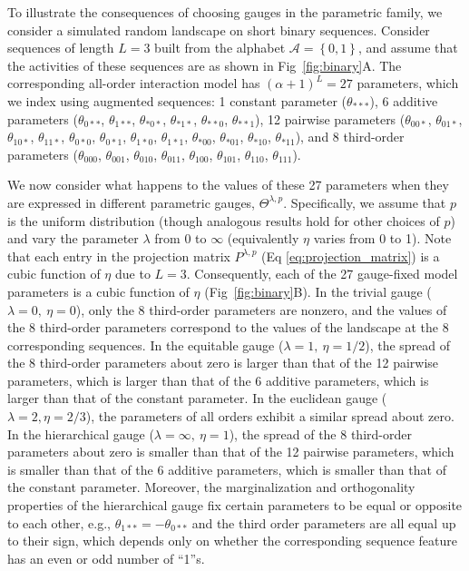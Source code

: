 \documentclass[10pt,letterpaper]{article}
\newcommand{\fig}[2]{Fig\ \ref{#1}#2}
\newcommand{\set}[1]{\left\{ #1 \right\}}
\begin{document}
To illustrate the consequences of choosing gauges in the parametric family, we consider a simulated random landscape on short binary sequences. Consider sequences of length $L = 3$ built from the alphabet $\mathcal{A} = \set{0,1}$, and assume that the activities of these sequences are as shown in \fig{fig:binary}A. The corresponding all-order interaction model has $(\alpha+1)^L=27$ parameters, which we index using augmented sequences: 1 constant parameter ($\theta_{***}$), 6 additive parameters ($\theta_{0**}$, $\theta_{1**}$, $\theta_{*0*}$, $\theta_{*1*}$, $\theta_{**0}$, $\theta_{**1}$), 12 pairwise parameters ($\theta_{00*}$, $\theta_{01*}$, $\theta_{10*}$, $\theta_{11*}$,  $\theta_{0*0}$, $\theta_{0*1}$, $\theta_{1*0}$, $\theta_{1*1}$, $\theta_{*00}$, $\theta_{*01}$, $\theta_{*10}$, $\theta_{*11}$), and 8 third-order parameters ($\theta_{000}$, $\theta_{001}$, $\theta_{010}$, $\theta_{011}$, $\theta_{100}$, $\theta_{101}$, $\theta_{110}$, $\theta_{111}$). 

We now consider what happens to the values of these 27 parameters when they are expressed in different parametric gauges, $\Theta^{\lambda,p}$. Specifically, we assume that $p$ is the uniform distribution (though analogous results hold for other choices of $p$) and vary the parameter $\lambda$ from $0$ to $\infty$ (equivalently $\eta$ varies from 0 to 1). Note that each entry in the projection matrix $P^{\lambda,p}$ (Eq \ref{eq:projection_matrix}) is a cubic function of $\eta$ due to $L=3$. Consequently,  each of the 27 gauge-fixed model parameters is a cubic function of $\eta$ (\fig{fig:binary}B). In the trivial gauge ($\lambda = 0,\ \eta = 0$), only the 8 third-order parameters are nonzero, and the values of the 8 third-order parameters correspond to the values of the landscape at the 8 corresponding sequences. In the equitable gauge ($\lambda = 1,\ \eta = 1/2$), the spread of the 8 third-order parameters about zero is larger than that of the 12 pairwise parameters, which is larger than that of the 6 additive parameters, which is larger than that of the constant parameter. In the euclidean gauge ($\lambda=2, \eta=2/3$), the parameters of all orders exhibit a similar spread about zero. In the hierarchical gauge ($\lambda = \infty,\ \eta = 1$), the spread of the 8 third-order parameters about zero is smaller than that of the 12 pairwise parameters, which is smaller than that of the 6 additive parameters, which is smaller than that of the constant parameter. Moreover, the marginalization and orthogonality properties of the hierarchical gauge fix certain parameters to be equal or opposite to each other, e.g., $\theta_{1**}=-\theta_{0**}$ and the third order parameters are all equal up to their sign, which depends only on whether the corresponding sequence feature has an even or odd number of ``1''s.
\end{document}
